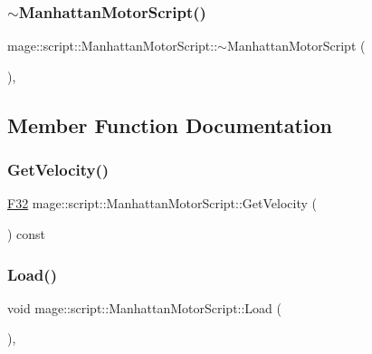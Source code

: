 \subsubsection{\texorpdfstring{$\sim$\+Manhattan\+Motor\+Script()}{~ManhattanMotorScript()}}
{\footnotesize\ttfamily mage\+::script\+::\+Manhattan\+Motor\+Script\+::$\sim$\+Manhattan\+Motor\+Script (\begin{DoxyParamCaption}{ }\end{DoxyParamCaption})\hspace{0.3cm}{\ttfamily [virtual]}, {\ttfamily [default]}}



\subsection{Member Function Documentation}
\hypertarget{classmage_1_1script_1_1_manhattan_motor_script_a2f73545bf2fb507375251d530054ac9b}{}\label{classmage_1_1script_1_1_manhattan_motor_script_a2f73545bf2fb507375251d530054ac9b} 
\subsubsection{\texorpdfstring{Get\+Velocity()}{GetVelocity()}}
{\footnotesize\ttfamily \hyperlink{namespacemage_aa97e833b45f06d60a0a9c4fc22ae02c0}{F32} mage\+::script\+::\+Manhattan\+Motor\+Script\+::\+Get\+Velocity (\begin{DoxyParamCaption}{ }\end{DoxyParamCaption}) const\hspace{0.3cm}{\ttfamily [noexcept]}}

\hypertarget{classmage_1_1script_1_1_manhattan_motor_script_aea733198d0f4b6e46815c3b91c3e8751}{}\label{classmage_1_1script_1_1_manhattan_motor_script_aea733198d0f4b6e46815c3b91c3e8751} 
\subsubsection{\texorpdfstring{Load()}{Load()}}
{\footnotesize\ttfamily void mage\+::script\+::\+Manhattan\+Motor\+Script\+::\+Load (\begin{DoxyParamCaption}{ }\end{DoxyParamCaption})\hspace{0.3cm}{\ttfamily [override]}, {\ttfamily [virtual]}}

